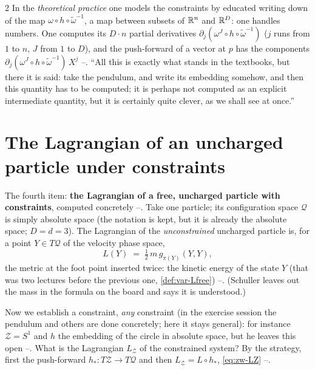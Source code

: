 \begin{paracol}{2}
In the \emph{theoretical practice} one models the constraints by educated writing down of the map $\omega\circ h\circ\tilde\omega^{-1}$, a map between subsets of $\mathbb{R}^n$ and $\mathbb{R}^D$: one handles numbers. One computes its $D\cdot n$ partial derivatives $\partial_j(\omega^J\circ h\circ\tilde\omega^{-1})$ ($j$ runs from $1$ to $n$, $J$ from $1$ to $D$), and the push-forward of a vector at $p$ has the components $\partial_j(\omega^J\circ h\circ\tilde\omega^{-1})\,X^j$ --. ``All this is exactly what stands in the textbooks, but there it is said: take the pendulum, and write its embedding somehow, and then this quantity has to be computed; it is perhaps not computed as an explicit intermediate quantity, but it is certainly quite clever, as we shall see at once.''

\section{The Lagrangian of an uncharged particle under constraints}\label{sec:zw-free}

The fourth item: \textbf{the Lagrangian of a free, uncharged particle with constraints}, computed concretely --. Take one particle; its configuration space $\mathcal Q$ is simply absolute space (the notation is kept, but it is already the absolute space; $D=d=3$). The Lagrangian of the \emph{unconstrained} uncharged particle is, for a point $Y\in T\mathcal Q$ of the velocity phase space,
\begin{equation}\label{eq:zw-Lfree}
  L(Y)\;=\;\tfrac12\,m\,g_{\pi(Y)}(Y,Y),
\end{equation}
the metric at the foot point inserted twice: the kinetic energy of the state $Y$ (that was two lectures before the previous one, \cref{def:var-Lfree}) --. (Schuller leaves out the mass in the formula on the board and says it is understood.)

Now we establish a constraint, \emph{any} constraint (in the exercise session the pendulum and others are done concretely; here it stays general): for instance $\mathcal Z=S^1$ and $h$ the embedding of the circle in absolute space, but he leaves this open --. What is the Lagrangian $L_{\mathcal Z}$ of the constrained system? By the strategy, first the push-forward $h_*\colon T\mathcal Z\to T\mathcal Q$ and then $L_{\mathcal Z}=L\circ h_*$, \eqref{eq:zw-LZ} --.


\end{paracol}
